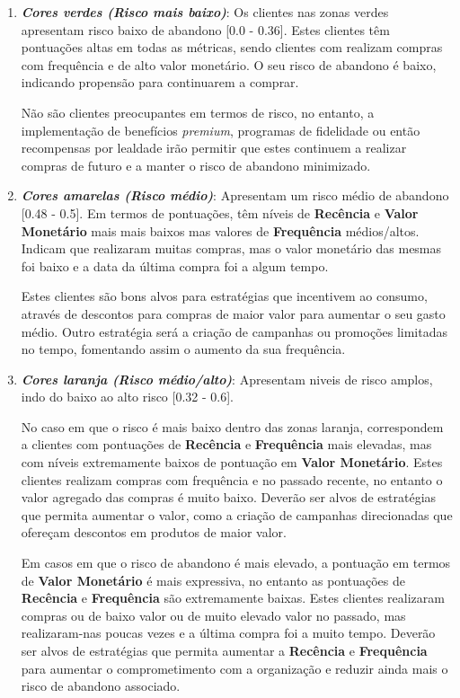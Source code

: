 \documentclass{easychair}
\begin{document}
\begin{enumerate}
	\item \textit{\textbf{Cores verdes (Risco mais baixo)}}: Os clientes nas zonas verdes apresentam risco baixo de abandono [0.0 - 0.36]. Estes clientes têm pontuações altas em todas as métricas, sendo clientes com realizam compras com frequência e de alto valor monetário. O seu risco de abandono é baixo, indicando propensão para continuarem a comprar.

Não são clientes preocupantes em termos de risco, no entanto, a implementação de benefícios \textit{premium}, programas de fidelidade ou então recompensas por lealdade irão permitir que estes continuem a realizar compras de futuro e a manter o risco de abandono minimizado.
	\item \textit{\textbf{Cores amarelas (Risco médio)}}: Apresentam um risco médio de abandono [0.48 - 0.5].
Em termos de pontuações, têm níveis de \textbf{Recência} e \textbf{Valor Monetário} mais mais baixos mas valores de \textbf{Frequência} médios/altos. Indicam que realizaram muitas compras, mas o valor monetário das mesmas foi baixo e a data da última compra foi a algum tempo.

Estes clientes são bons alvos para estratégias que incentivem ao consumo, através de descontos para compras de maior valor para aumentar o seu gasto médio. Outro estratégia será a criação de campanhas ou promoções limitadas no tempo, fomentando assim o aumento da sua frequência.
	\item \textit{\textbf{Cores laranja (Risco médio/alto)}}: Apresentam niveis de risco amplos, indo do baixo ao alto risco [0.32 - 0.6].

No caso em que o risco é mais baixo dentro das zonas laranja, correspondem a clientes com pontuações de \textbf{Recência} e \textbf{Frequência} mais elevadas, mas com níveis extremamente baixos de pontuação em \textbf{Valor Monetário}. Estes clientes realizam compras com frequência e no passado recente, no entanto o valor agregado das compras é muito baixo. Deverão ser alvos de estratégias que permita aumentar o valor, como a criação de campanhas direcionadas que ofereçam descontos em produtos de maior valor.

Em casos em que o risco de abandono é mais elevado, a pontuação em termos de \textbf{Valor Monetário} é mais expressiva, no entanto as pontuações de \textbf{Recência} e \textbf{Frequência} são extremamente baixas. Estes clientes realizaram compras ou de baixo valor ou de muito elevado valor no passado, mas realizaram-nas poucas vezes e a última compra foi a muito tempo. Deverão ser alvos de estratégias que permita aumentar a \textbf{Recência} e \textbf{Frequência} para aumentar o comprometimento com a organização e reduzir ainda mais o risco de abandono associado.


\end{enumerate}
\end{document}

